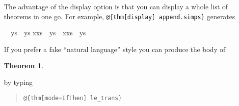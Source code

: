 \begin{isabellebody}
\begin{isamarkuptext}
The advantage of the display option is that you can display a whole
list of theorems in one go. For example,
\verb!@!\verb!{thm[display] append.simps}!
generates \begin{isabelle}%
{}{}\ \isacharat\ ys\ {}\ ys\isasep\isanewline%
x{}xs\ \isacharat\ ys\ {}\ x{}xs\ \isacharat\ ys%
\end{isabelle}%
\end{isamarkuptext}%
\isamarkuptrue%
%
\isamarkuptrue%
%
\begin{isamarkuptext}%
If you prefer a fake ``natural language'' style you can produce
the body of
\newtheorem{theorem}{Theorem}
\begin{theorem}
\end{theorem}
by typing
\begin{quote}
\verb!@!\verb!{thm[mode=IfThen] le_trans}!
\end{quote}


\end{isamarkuptext}
\end{isabellebody}
